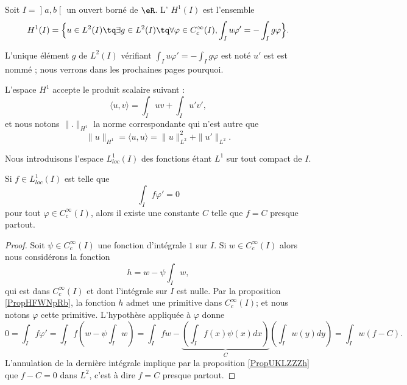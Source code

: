 \begin{definition}
    Soit \( I=\mathopen] a , b \mathclose[\) un ouvert borné de \( \eR\). L' \( H^1(I)\) est l'ensemble
    \begin{equation}
        H^1(I)=\Big\{   u\in L^2(I)\tq\exists g\in L^2(I)\tq\forall \varphi\in  C^{\infty}_c(I),\int_Iu\varphi'=-\int_Ig\varphi   \Big\}.
    \end{equation}
\end{definition}
 
L'unique élément \( g\) de \( L^2(I)\) vérifiant \( \int_Iu\varphi'=-\int_Ig\varphi\) est noté \( u'\) est est nommé ; nous verrons dans les prochaines pages pourquoi.

L'espace \( H^1\) accepte le produit scalaire suivant :
\begin{equation}
    \langle u, v\rangle =\int_Iuv+\int_Iu'v',
\end{equation}
et nous notons \( \| . \|_{H^1}\) la norme correspondante qui n'est autre que
\begin{equation}
    \| u \|_{H^1}=\langle u, u\rangle =\| u \|^2_{L^2}+\| u' \|_{L^2}.
\end{equation}

Nous introduisons l'espace \( L^1_{loc}(I)\) des fonctions étant \( L^1\) sur tout compact de \( I\). 

\begin{proposition} \label{PropLGoLtcS}
    Si \( f\in L^1_{loc}(I)\) est telle que
    \begin{equation}
        \int_If\varphi'=0
    \end{equation}
    pour tout \( \varphi\in  C^{\infty}_c(I)\), alors il existe une constante \( C\) telle que \( f=C\) presque partout.
\end{proposition}

\begin{proof}
    Soit \( \psi\in C^{\infty}_c(I)\) une fonction d'intégrale \( 1\) sur \( I\). Si \( w\in C^{\infty}_c(I)\) alors nous considérons la fonction
    \begin{equation}
        h=w-\psi\int_Iw,
    \end{equation}
    qui est dans \(  C^{\infty}_c(I)\) et dont l'intégrale sur \( I\) est nulle. Par la proposition \ref{PropHFWNpRb}, la fonction \( h\) admet une primitive dans \(  C^{\infty}_c(I)\); et nous notons \( \varphi\) cette primitive. L'hypothèse appliquée à \( \varphi\) donne
    \begin{equation}
        0=\int_If\varphi'=\int_If\left( w-\psi\int_Iw \right)=\int_Ifw-\underbrace{\left( \int_If(x)\psi(x)dx \right)}_C\left( \int_Iw(y)dy \right)=\int_Iw(f-C).
    \end{equation}
    L'annulation de la dernière intégrale implique par la proposition \ref{PropUKLZZZh} que \( f-C=0\) dans \( L^2\), c'est à dire \( f=C\) presque partout.
\end{proof}

